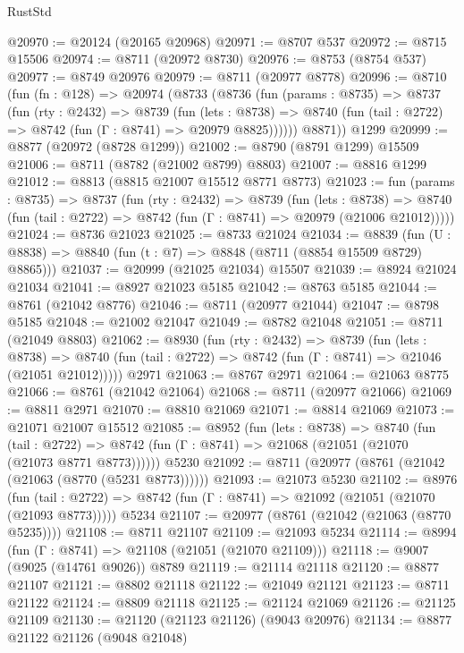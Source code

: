 \begin{lexlean}{RustStd}
\begin{coremodule}
@20970 := @20124 (@20165 @20968)
@20971 := @8707 @537
@20972 := @8715 @15506
@20974 := @8711 (@20972 @8730)
@20976 := @8753 (@8754 @537)
@20977 := @8749 @20976
@20979 := @8711 (@20977 @8778)
@20996 := @8710
    (fun (fn : @128) =>
    @20974
      (@8733
        (@8736
          (fun (params : @8735) =>
          @8737
            (fun (rty : @2432) =>
            @8739
              (fun (lets : @8738) =>
              @8740 (fun (tail : @2722) => @8742 (fun (Γ : @8741) => @20979 @8825))))))
        @8871))
    @1299
@20999 := @8877 (@20972 (@8728 @1299))
@21002 := @8790 (@8791 @1299) @15509
@21006 := @8711 (@8782 (@21002 @8799) @8803)
@21007 := @8816 @1299
@21012 := @8813 (@8815 @21007 @15512 @8771 @8773)
@21023 := fun (params : @8735) =>
  @8737
    (fun (rty : @2432) =>
    @8739
      (fun (lets : @8738) =>
      @8740 (fun (tail : @2722) => @8742 (fun (Γ : @8741) => @20979 (@21006 @21012)))))
@21024 := @8736 @21023
@21025 := @8733 @21024
@21034 := @8839
    (fun (U : @8838) => @8840 (fun (t : @7) => @8848 (@8711 (@8854 @15509 @8729) @8865)))
@21037 := @20999 (@21025 @21034) @15507
@21039 := @8924 @21024 @21034
@21041 := @8927 @21023 @5185
@21042 := @8763 @5185
@21044 := @8761 (@21042 @8776)
@21046 := @8711 (@20977 @21044)
@21047 := @8798 @5185
@21048 := @21002 @21047
@21049 := @8782 @21048
@21051 := @8711 (@21049 @8803)
@21062 := @8930
    (fun (rty : @2432) =>
    @8739
      (fun (lets : @8738) =>
      @8740 (fun (tail : @2722) => @8742 (fun (Γ : @8741) => @21046 (@21051 @21012)))))
    @2971
@21063 := @8767 @2971
@21064 := @21063 @8775
@21066 := @8761 (@21042 @21064)
@21068 := @8711 (@20977 @21066)
@21069 := @8811 @2971
@21070 := @8810 @21069
@21071 := @8814 @21069
@21073 := @21071 @21007 @15512
@21085 := @8952
    (fun (lets : @8738) =>
    @8740
      (fun (tail : @2722) =>
      @8742 (fun (Γ : @8741) => @21068 (@21051 (@21070 (@21073 @8771 @8773))))))
    @5230
@21092 := @8711 (@20977 (@8761 (@21042 (@21063 (@8770 (@5231 @8773))))))
@21093 := @21073 @5230
@21102 := @8976
    (fun (tail : @2722) => @8742 (fun (Γ : @8741) => @21092 (@21051 (@21070 (@21093 @8773)))))
    @5234
@21107 := @20977 (@8761 (@21042 (@21063 (@8770 @5235))))
@21108 := @8711 @21107
@21109 := @21093 @5234
@21114 := @8994 (fun (Γ : @8741) => @21108 (@21051 (@21070 @21109)))
@21118 := @9007 (@9025 (@14761 @9026)) @8789
@21119 := @21114 @21118
@21120 := @8877 @21107
@21121 := @8802 @21118
@21122 := @21049 @21121
@21123 := @8711 @21122
@21124 := @8809 @21118
@21125 := @21124 @21069
@21126 := @21125 @21109
@21130 := @21120 (@21123 @21126) (@9043 @20976)
@21134 := @8877 @21122 @21126 (@9048 @21048)

\end{coremodule}
\end{lexlean}
